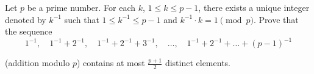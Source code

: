 Let $p$ be a prime number. For each $k$,  $1\le k\le p-1$,  there exists a unique integer denoted by $k^{-1}$ such that $1\le k^{-1}\le p-1$ and $k^{-1}\cdot k=1\pmod{p}$. Prove that the sequence\[1^{-1},\quad 1^{-1}+2^{-1},\quad 1^{-1}+2^{-1}+3^{-1},\quad \ldots ,\quad 1^{-1}+2^{-1}+\ldots +(p-1)^{-1} \]

(addition modulo $p$) contains at most $\frac{p+1}{2}$ distinct elements.